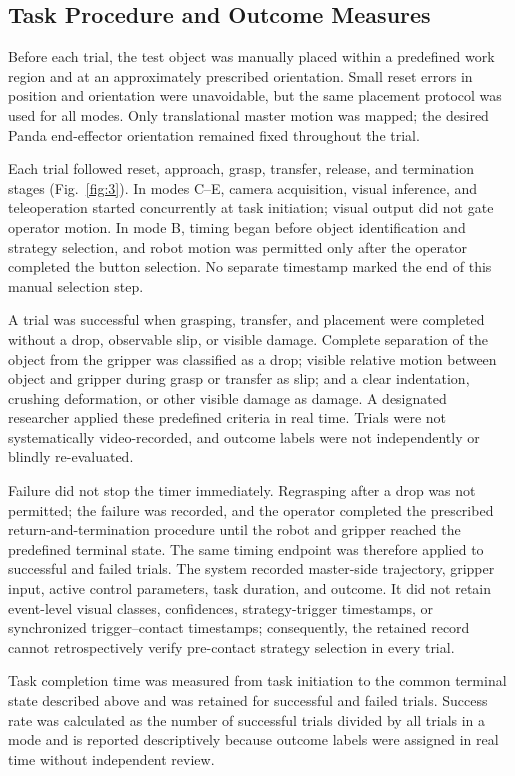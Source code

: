 \subsection{Task Procedure and Outcome Measures}
Before each trial, the test object was manually placed within a predefined work region and at an approximately prescribed orientation. Small reset errors in position and orientation were unavoidable, but the same placement protocol was used for all modes. Only translational master motion was mapped; the desired Panda end-effector orientation remained fixed throughout the trial.

Each trial followed reset, approach, grasp, transfer, release, and termination stages (Fig.~\ref{fig:3}). In modes C--E, camera acquisition, visual inference, and teleoperation started concurrently at task initiation; visual output did not gate operator motion. In mode B, timing began before object identification and strategy selection, and robot motion was permitted only after the operator completed the button selection. No separate timestamp marked the end of this manual selection step.

A trial was successful when grasping, transfer, and placement were completed without a drop, observable slip, or visible damage. Complete separation of the object from the gripper was classified as a drop; visible relative motion between object and gripper during grasp or transfer as slip; and a clear indentation, crushing deformation, or other visible damage as damage. A designated researcher applied these predefined criteria in real time. Trials were not systematically video-recorded, and outcome labels were not independently or blindly re-evaluated.

Failure did not stop the timer immediately. Regrasping after a drop was not permitted; the failure was recorded, and the operator completed the prescribed return-and-termination procedure until the robot and gripper reached the predefined terminal state. The same timing endpoint was therefore applied to successful and failed trials. The system recorded master-side trajectory, gripper input, active control parameters, task duration, and outcome. It did not retain event-level visual classes, confidences, strategy-trigger timestamps, or synchronized trigger--contact timestamps; consequently, the retained record cannot retrospectively verify pre-contact strategy selection in every trial.

Task completion time was measured from task initiation to the common terminal state described above and was retained for successful and failed trials. Success rate was calculated as the number of successful trials divided by all trials in a mode and is reported descriptively because outcome labels were assigned in real time without independent review.

